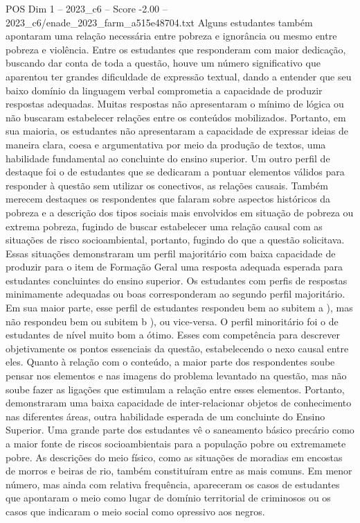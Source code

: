 \begin{textsample}{POS Dim 1 – 2023\_c6 – Score -2.00 – 2023\_c6/enade\_2023\_farm\_a515e48704.txt}
Alguns estudantes também apontaram uma relação necessária entre pobreza e ignorância ou mesmo entre pobreza e violência.
Entre os estudantes que responderam com maior dedicação, buscando dar conta de toda a questão, houve um número significativo que aparentou ter grandes dificuldade de expressão textual, dando a entender que seu baixo domínio da linguagem verbal comprometia a capacidade de produzir respostas adequadas.
Muitas respostas não apresentaram o mínimo de lógica ou não buscaram estabelecer relações entre os conteúdos mobilizados.
Portanto, em sua maioria, os estudantes não apresentaram a capacidade de expressar ideias de maneira clara, coesa e argumentativa por meio da produção de textos, uma habilidade fundamental ao concluinte do ensino superior.
Um outro perfil de destaque foi o de estudantes que se dedicaram a pontuar elementos válidos para responder à questão sem utilizar os conectivos, as relações causais.
Também merecem destaques os respondentes que falaram sobre aspectos históricos da pobreza e a descrição dos tipos sociais mais envolvidos em situação de pobreza ou extrema pobreza, fugindo de buscar estabelecer uma relação causal com as situações de risco socioambiental, portanto, fugindo do que a questão solicitava.
Essas situações demonstraram um perfil majoritário com baixa capacidade de produzir para o item de Formação Geral uma resposta adequada esperada para estudantes concluintes do ensino superior.
Os estudantes com perfis de respostas minimamente adequadas ou boas corresponderam ao segundo perfil majoritário.
Em sua maior parte, esse perfil de estudantes respondeu bem ao subitem a ), mas não respondeu bem ou subitem b ), ou vice-versa.
O perfil minoritário foi o de estudantes de nível muito bom a ótimo.
Esses com competência para descrever objetivamente os pontos essenciais da questão, estabelecendo o nexo causal entre eles.
Quanto à relação com o conteúdo, a maior parte dos respondentes soube pensar nos elementos e nas imagens do problema levantado na questão, mas não soube fazer as ligações que estimulam a relação entre esses elementos.
Portanto, demonstraram uma baixa capacidade de inter-relacionar objetos de conhecimento nas diferentes áreas, outra habilidade esperada de um concluinte do Ensino Superior.
Uma grande parte dos estudantes vê o saneamento básico precário como a maior fonte de riscos socioambientais para a população pobre ou extremamete pobre.
As descrições do meio físico, como as situações de moradias em encostas de morros e beiras de rio, também constituíram entre as mais comuns.
Em menor número, mas ainda com relativa frequência, apareceram os casos de estudantes que apontaram o meio como lugar de domínio territorial de criminosos ou os casos que indicaram o meio social como opressivo aos negros.

\end{textsample}
